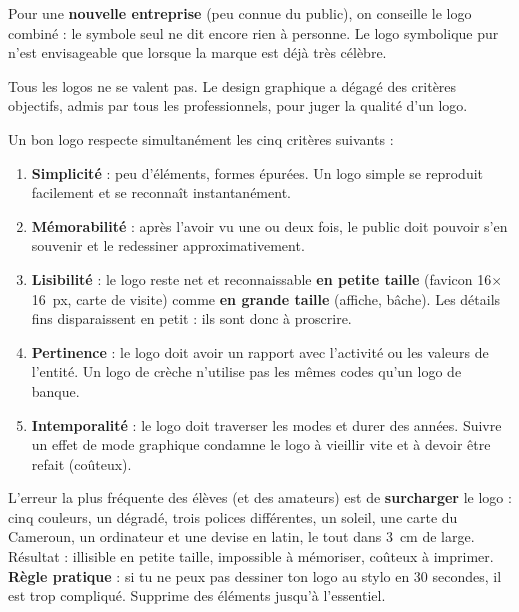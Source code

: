 \documentclass[11pt]{article}
\newcommand{\cle}[1]{{\popxbold\color{popdark}#1}}
\newcounter{popsec}
\newcounter{popsub}
\newcommand{\courssub}[1]{%
  \stepcounter{popsub}%
  \par\vspace{9pt}\noindent{\popxbold\fontsize{11.5}{13}\selectfont\color{popink}{\color{poporange}\thepopsec.\thepopsub}\hspace{6pt}#1}\par\nopagebreak\vspace{4pt}
}
\begin{document}
\begin{aretenir}
Pour une \textbf{nouvelle entreprise} (peu connue du public), on conseille le \cle{logo combiné} : le symbole seul ne dit encore rien à personne. Le logo symbolique pur n'est envisageable que lorsque la marque est déjà très célèbre.
\end{aretenir}

\courssub{Les cinq critères d'un bon logo}

Tous les logos ne se valent pas. Le design graphique a dégagé des critères objectifs, admis par tous les professionnels, pour juger la qualité d'un logo.

\begin{propriete}
Un bon logo respecte simultanément les cinq critères suivants :
\begin{enumerate}
  \item \textbf{Simplicité} : peu d'éléments, formes épurées. Un logo simple se reproduit facilement et se reconnaît instantanément.
  \item \textbf{Mémorabilité} : après l'avoir vu une ou deux fois, le public doit pouvoir s'en souvenir et le redessiner approximativement.
  \item \textbf{Lisibilité} : le logo reste net et reconnaissable \textbf{en petite taille} (favicon 16$\times$16~px, carte de visite) comme \textbf{en grande taille} (affiche, bâche). Les détails fins disparaissent en petit : ils sont donc à proscrire.
  \item \textbf{Pertinence} : le logo doit avoir un rapport avec l'activité ou les valeurs de l'entité. Un logo de crèche n'utilise pas les mêmes codes qu'un logo de banque.
  \item \textbf{Intemporalité} : le logo doit traverser les modes et durer des années. Suivre un effet de mode graphique condamne le logo à vieillir vite et à devoir être refait (coûteux).
\end{enumerate}
\end{propriete}

\begin{attention}
L'erreur la plus fréquente des élèves (et des amateurs) est de \textbf{surcharger} le logo : cinq couleurs, un dégradé, trois polices différentes, un soleil, une carte du Cameroun, un ordinateur et une devise en latin, le tout dans 3~cm de large. Résultat : illisible en petite taille, impossible à mémoriser, coûteux à imprimer. \textbf{Règle pratique} : si tu ne peux pas dessiner ton logo au stylo en 30 secondes, il est trop compliqué. Supprime des éléments jusqu'à l'essentiel.
\end{attention}
\end{document}
